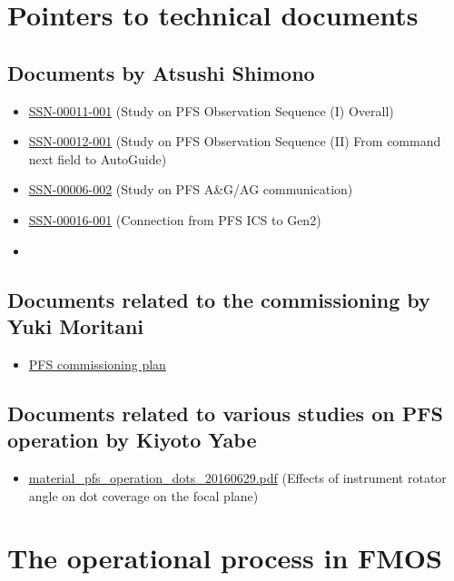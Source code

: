 \documentclass[a4paper]{article}
\begin{document}
\clearpage
\appendix
\section{Pointers to technical documents}

\subsection{Documents by Atsushi Shimono \label{appendix:documents:shimono}}
\begin{itemize}
\item \href{http://sumire.pbworks.com/w/file/102897967/SSN-00011-001-ICSSeq-1-Overall.pptx}{SSN-00011-001} (Study on PFS Observation Sequence (I) Overall)
\item \href{http://sumire.pbworks.com/w/file/94687160/SSN-00012-001-ICSSeq-2-CommandToAG.pptx}{SSN-00012-001} (Study on PFS Observation Sequence (II) From command next field to AutoGuide)
\item \href{http://sumire.pbworks.com/w/file/93138234/SSN-00006-001-AGtoGen2.pptx}{SSN-00006-002} (Study on PFS A\&G/AG communication)
\item \href{http://sumire.pbworks.com/w/file/101124121/SSN-00016-001-Gen2-OBCP.pptx}{SSN-00016-001} (Connection from PFS ICS to Gen2)
\item 
\end{itemize}

\subsection{Documents related to the commissioning by Yuki Moritani\label{appendix:documents:moritani}}
\begin{itemize}
\item \href{}{PFS commissioning plan}
\end{itemize}

\subsection{Documents related to various studies on PFS operation by Kiyoto Yabe\label{appendix:documents:yabe}}
\begin{itemize}
\item \href{http://member.ipmu.jp/kiyoto.yabe/PFS/tmp/material_pfs_operation_dots_20160629.pdf}{material\_pfs\_operation\_dots\_20160629.pdf} (Effects of instrument rotator angle on dot coverage on the focal plane)
\end{itemize}

\section{The operational process in FMOS}
\subsection{}
\end{document}

